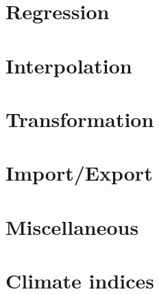 \newpage
\section{Regression}




\newpage
\section{Interpolation}




\newpage
\section{Transformation}




\newpage
\section{Import/Export}




\newpage
\section{Miscellaneous}




\newpage
\section{Climate indices}




